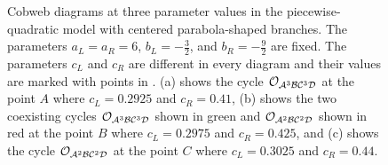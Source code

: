 \begin{figure}
	\centering
	\caption[Cobweb diagrams at three parameter values in the piecewise-quadratic model with centered parabola-shaped branches]{
		Cobweb diagrams at three parameter values in the piecewise-quadratic model with centered parabola-shaped branches.
		The parameters $a_L = a_R = 6$, $b_L = -\frac{3}{2}$, and $b_R = -\frac{9}{2}$ are fixed.
		The parameters $c_L$ and $c_R$ are different in every diagram and their values are marked with points in .
		(a) shows the cycle $\mathcal{O}_{\mathcal{A}^3\mathcal{B}\mathcal{C}^3\mathcal{D}}$ at the point $A$ where $c_L = 0.2925$ and $c_R = 0.41$,
		(b) shows the two coexisting cycles $\mathcal{O}_{\mathcal{A}^3\mathcal{B}\mathcal{C}^3\mathcal{D}}$ shown in green and $\mathcal{O}_{\mathcal{A}^2\mathcal{B}\mathcal{C}^2\mathcal{D}}$ shown in red at the point $B$ where $c_L = 0.2975$ and $c_R = 0.425$,
		and (c) shows the cycle $\mathcal{O}_{\mathcal{A}^2\mathcal{B}\mathcal{C}^2\mathcal{D}}$ at the point $C$ where $c_L = 0.3025$ and $c_R = 0.44$.
	}
	\label{fig:setup.quad.even.cobwebs}
\end{figure}

